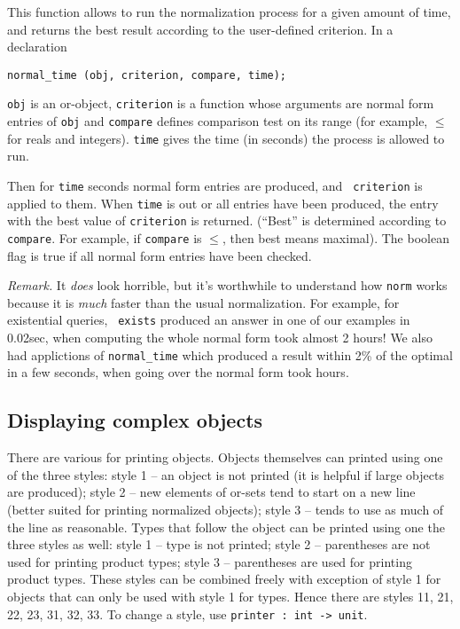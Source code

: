 This function allows to run the normalization process for a given
amount of time, and returns the best result according to the
user-defined criterion. 
In a declaration

{\small
\begin{verbatim}
normal_time (obj, criterion, compare, time);
\end{verbatim}
}

{\tt obj} is an or-object, {\tt criterion} is a function whose
arguments are normal form entries of {\tt obj} and {\tt compare}
defines comparison test on its range (for example, $\leq$ for reals
and integers). {\tt time} gives the time (in seconds) the process is
allowed to run.

Then for {\tt time} seconds normal form entries are produced, and {\tt
criterion} is applied to them. When {\tt time} is out or all entries
have been produced, the entry with the best value of {\tt criterion}
is returned. (``Best'' is determined according to {\tt compare}. For
example, if {\tt compare} is $\leq$, then best means maximal). The
boolean flag is true if all normal form entries have been checked.



{\em Remark.}  It {\em does} look horrible, but it's worthwhile to
understand how {\tt norm} works because it is {\em much} faster than
the usual normalization. For example, for existential queries, {\tt
exists} produced an answer in one of our examples in 0.02sec, when
computing the whole normal form took almost 2 hours! We also had
applictions of {\tt normal\_time} which produced a result within 2\%
of the optimal in a few seconds, when going over the normal form took
hours. 




\subsection{Displaying complex objects}

There are various for printing objects. Objects themselves can printed
using one of the three styles: style 1 -- an object is not printed (it
is helpful if large objects are produced); style 2 -- new elements of
or-sets tend to start on a new line (better suited for printing
normalized objects); style 3 -- tends to use as much of the line as
reasonable. Types that follow the object can be printed using one
the three styles as well: style 1 -- type is not printed; style 2 --
parentheses are not used for printing product types; style 3 --
parentheses are used for printing product types. These styles can be
combined freely with exception of style 1 for objects that can only be
used with style 1 for types. Hence there are styles 11, 21, 22, 23,
31, 32, 33. To change a style, use {\tt printer : int -> unit}.


